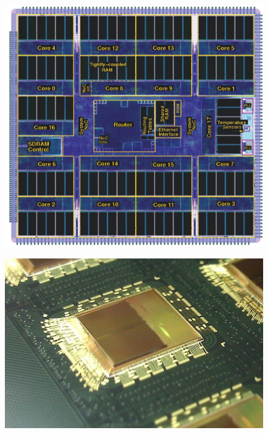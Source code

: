 \begin{figure}[h]
\centering
\begin{minipage}{.6\textwidth}
  \centering
  \includegraphics[width=1\linewidth, natwidth=608, natheight=571]{images/chip.png}
  \label{fig:chip_layout}
\end{minipage}
\begin{minipage}{.3\textwidth}
  \centering
  \includegraphics[width=1\linewidth, natwidth=640, natheight=422]{images/spinn_dies.jpg}
  \label{fig:spinn_dies}
\end{minipage}
\end{figure}

